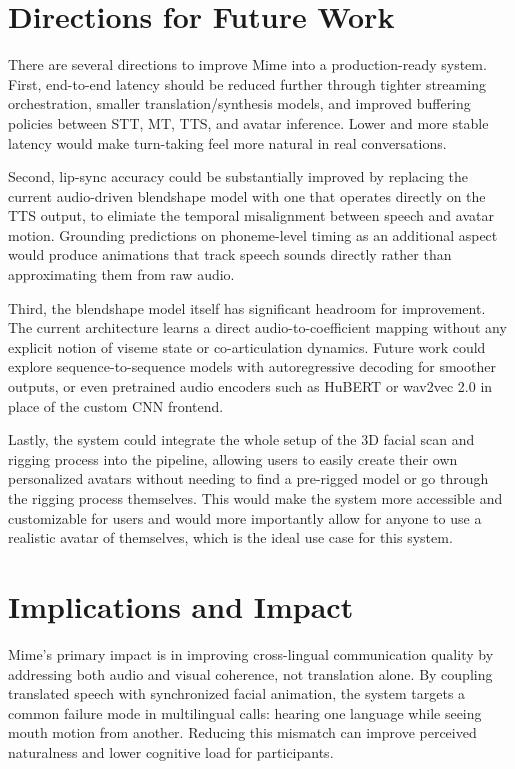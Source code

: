 \section{Directions for Future Work}

There are several directions to improve Mime into a production-ready system. First, end-to-end latency should be reduced further through tighter streaming orchestration, smaller translation/synthesis models, and improved buffering policies between STT, MT, TTS, and avatar inference. Lower and more stable latency would make turn-taking feel more natural in real conversations.

Second, lip-sync accuracy could be substantially improved by replacing the current audio-driven blendshape model with one that operates directly on the TTS output, to elimiate the temporal misalignment between speech and avatar motion. Grounding predictions on phoneme-level timing as an additional aspect would produce animations that track speech sounds directly rather than approximating them from raw audio.

Third, the blendshape model itself has significant headroom for improvement. The current architecture learns a direct audio-to-coefficient mapping without any explicit notion of viseme state or co-articulation dynamics. Future work could explore sequence-to-sequence models with autoregressive decoding for smoother outputs, or even pretrained audio encoders such as HuBERT or wav2vec 2.0 in place of the custom CNN frontend.

Lastly, the system could integrate the whole setup of the 3D facial scan and rigging process into the pipeline, allowing users to easily create their own personalized avatars without needing to find a pre-rigged model or go through the rigging process themselves. This would make the system more accessible and customizable for users and would more importantly allow for anyone to use a realistic avatar of themselves, which is the ideal use case for this system.

\section{Implications and Impact}

Mime's primary impact is in improving cross-lingual communication quality by addressing both audio and visual coherence, not translation alone. By coupling translated speech with synchronized facial animation, the system targets a common failure mode in multilingual calls: hearing one language while seeing mouth motion from another. Reducing this mismatch can improve perceived naturalness and lower cognitive load for participants.

